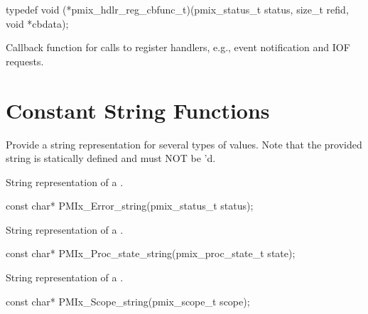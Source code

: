 \cspecificstart
\begin{codepar}
typedef void (*pmix_hdlr_reg_cbfunc_t)(pmix_status_t status,
                                       size_t refid,
                                       void *cbdata);
\end{codepar}
\cspecificend

\begin{arglist}
\end{arglist}

\descr

Callback function for calls to register handlers, e.g., event notification and IOF requests.


\section{Constant String Functions}

Provide a string representation for several types of values.
Note that the provided string is statically defined and must NOT be 'd.

\summary
{}

String representation of a .

\cspecificstart
\begin{codepar}
const char*
PMIx_Error_string(pmix_status_t status);
\end{codepar}
\cspecificend

\summary
{}

String representation of a .

\cspecificstart
\begin{codepar}
const char*
PMIx_Proc_state_string(pmix_proc_state_t state);
\end{codepar}
\cspecificend

\summary
{}

String representation of a .

\cspecificstart
\begin{codepar}
const char*
PMIx_Scope_string(pmix_scope_t scope);
\end{codepar}
\cspecificend

